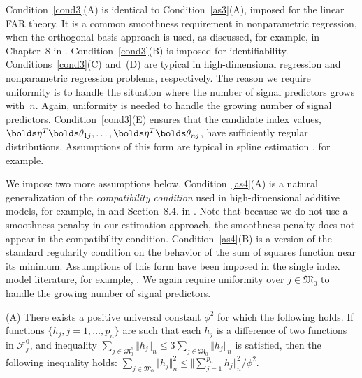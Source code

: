 \documentclass[aos,MSNbibl,dvips]{arximspdf}
\newcommand{\rrVert}{\Vert}
\newcommand{\llVert}{\Vert}
\newcommand{\btheta}{\bolds\theta}
\newcommand{\bfeta}{\bolds\eta}
\newcommand{\F}{{\mathcal F}}
\newcommand{\Mfrak}{\mathfrak{M}}
\begin{document}
\begin{appendix}
Condition~\ref{cond3}(A) is identical to Condition~\ref{as3}(A),
imposed for the linear FAR theory. It is a common smoothness
requirement in nonparametric regression, when the orthogonal basis
approach is used, as discussed, for example, in Chapter~8 in \cite
{Bwasserman1}. Condition~\ref{cond3}(B) is imposed for
identifiability. Conditions~\ref{cond3}(C) and~(D) are typical in
high-dimensional regression and nonparametric regression problems,
respectively. The reason we require uniformity is to handle the
situation where the number of signal predictors grows with~$n$. Again,
uniformity is needed to handle the growing number of signal predictors.\vspace*{1pt}
Condition~\ref{cond3}(E) ensures that the candidate index values,
$\bfeta^T\btheta_{1j},\ldots, \bfeta^T\btheta_{nj}$, have
sufficiently regular distributions. Assumptions of this form are
typical in spline estimation \cite{zhou2}, for example.

We impose two more assumptions below. Condition~\ref{as4}(A) is a
natural generalization of the \emph{compatibility condition} used in
high-dimensional additive models, for example, in \cite{meier1} and
Section~8.4. in \cite{Bbuhlmann1}. Note that because we do not use a
smoothness penalty in our estimation approach, the smoothness penalty
does not appear in the compatibility condition. Condition~\ref{as4}(B)
is a version of the standard regularity condition on the behavior of
the sum of squares function near its minimum. Assumptions of this form
have been imposed in the single index model literature, for example,
\cite{yu1}. We again require uniformity over $j\in\Mfrak_0$ to
handle the growing number of signal predictors.

\begin{assumption}\label{as4}
(A) There exists a positive universal constant $\phi^2$ for
which the following holds. If functions $\{h_j, j=1,\ldots,{p_n}\}$
are such that each $h_j$ is a difference of two functions in $\F_j^0$,
and inequality $\sum_{j\in\Mfrak_0^c}\llVert h_{j}\rrVert _n\le3\sum
_{j\in
\Mfrak_0}\llVert h_{j}\rrVert _n$ is satisfied, then the following inequality
holds: $\sum_{j\in\Mfrak_0}\llVert h_{j}\rrVert _n^2\le\llVert \sum
_{j=1}^{{p_n}}h_j\rrVert ^2_n/\phi^2$.


\end{assumption}
\end{appendix}
\end{document}
